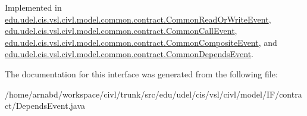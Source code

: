 Implemented in \hyperlink{classedu_1_1udel_1_1cis_1_1vsl_1_1civl_1_1model_1_1common_1_1contract_1_1CommonReadOrWriteEvent_a1d5f52ca016f0086cd95fb2daf2b10d3}{edu.\+udel.\+cis.\+vsl.\+civl.\+model.\+common.\+contract.\+Common\+Read\+Or\+Write\+Event}, \hyperlink{classedu_1_1udel_1_1cis_1_1vsl_1_1civl_1_1model_1_1common_1_1contract_1_1CommonCallEvent_a711b95ca27223e675ed31afd028fadfa}{edu.\+udel.\+cis.\+vsl.\+civl.\+model.\+common.\+contract.\+Common\+Call\+Event}, \hyperlink{classedu_1_1udel_1_1cis_1_1vsl_1_1civl_1_1model_1_1common_1_1contract_1_1CommonCompositeEvent_ae71f872c2bc59743ab76af73e2a8d68c}{edu.\+udel.\+cis.\+vsl.\+civl.\+model.\+common.\+contract.\+Common\+Composite\+Event}, and \hyperlink{classedu_1_1udel_1_1cis_1_1vsl_1_1civl_1_1model_1_1common_1_1contract_1_1CommonDependsEvent_a1cd6928e50ae3a3d1b08c5bf4e491471}{edu.\+udel.\+cis.\+vsl.\+civl.\+model.\+common.\+contract.\+Common\+Depends\+Event}.



The documentation for this interface was generated from the following file\+:\begin{DoxyCompactItemize}
\item 
/home/arnabd/workspace/civl/trunk/src/edu/udel/cis/vsl/civl/model/\+I\+F/contract/Depends\+Event.\+java\end{DoxyCompactItemize}
